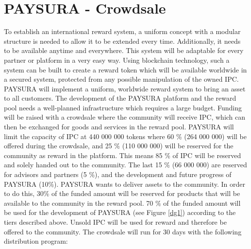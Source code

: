 \documentclass[twoside,onecolumn]{article}
\begin{document}
\section{PAYSURA - Crowdsale}
To establish an international reward system, a uniform concept with a modular structure is needed to allow it to be extended every time. Additionally, it needs to be available anytime and everywhere. This system will be adaptable for every partner or platform in a very easy way. Using blockchain technology, such a system can be built to create a reward token which will be available worldwide in a secured system, protected from any possible manipulation of the owned IPC. PAYSURA will implement a uniform, worldwide reward system to bring an asset to all customers.
The development of the PAYSURA platform and the reward pool needs a well-planned infrastructure which requires a large budget. Funding will be raised with a crowdsale where the community will receive IPC, which can then be exchanged for goods and services in the reward pool. PAYSURA will limit the capacity of IPC at 440 000 000 tokens where 60 \% (264 000 000) will be offered during the crowdsale, and 25 \% (110 000 000) will be reserved for the community as reward in the platform. This means 85 \% of IPC will be reserved and solely handed out to the community. The last 15 \% (66 000 000) are reserved for advisors and partners (5 \%), and the development and future progress of PAYSURA (10\%). 
PAYSURA wants to deliver assets to the community. In order to do this, 30\% of the funded amount will be reserved for products that will be available to the community in the reward pool.  70 \% of the funded amount will be used for the development of PAYSURA (see Figure \ref{dg1}) according to the tiers described above. Unsold IPC will be used for reward and therefore be offered to the community.
The crowdsale will run for 30 days with the following distribution program:
\end{document}
